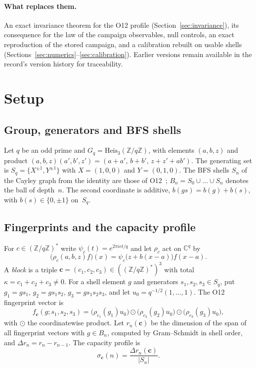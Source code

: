 \documentclass[12pt,a4paper]{article}
\theoremstyle{definition}
\theoremstyle{remark}
\newcommand{\Heis}{\mathrm{Heis}_3}
\newcommand{\Zq}{\mathbb{Z}/q\mathbb{Z}}
\newcommand{\Zqs}{(\mathbb{Z}/q\mathbb{Z})^{*}}
\begin{document}
  \paragraph{What replaces them.}
  An exact invariance theorem for the O12 profile (Section~\ref{sec:invariance}), its
  consequence for the law of the campaign observables, null controls, an exact reproduction of
  the stored campaign, and a calibration rebuilt on usable shells
  (Sections~\ref{sec:numerics}--\ref{sec:calibration}).
  Earlier versions remain available in the record's version history for traceability.

  \section{Setup}
  \label{sec:setup}

  \subsection{Group, generators and BFS shells}

    Let $q$ be an odd prime and $G_q=\Heis(\Zq)$, with elements $(a,b,z)$ and product
    $(a,b,z)(a',b',z')=(a+a',\,b+b',\,z+z'+ab')$.
    The generating set is $S_q=\{X^{\pm1},Y^{\pm1}\}$ with $X=(1,0,0)$ and $Y=(0,1,0)$.
    The BFS shells $S_n$ of the Cayley graph from the identity are those of
    O12~\cite{Beau2026a16}; $B_n=S_0\cup\dots\cup S_n$ denotes the ball of depth~$n$.
    The second coordinate is additive, $b(gs)=b(g)+b(s)$, with $b(s)\in\{0,\pm1\}$ on~$S_q$.

  \subsection{Fingerprints and the capacity profile}

    For $c\in\Zqs$ write $\psi_c(t)=e^{2\pi i ct/q}$ and let $\rho_c$ act on $\mathbb{C}^q$ by
    \begin{equation}
      \bigl(\rho_c(a,b,z)f\bigr)(x)=\psi_c\bigl(z+b(x-a)\bigr)f(x-a).
      \label{eq:schrodinger}
    \end{equation}
    A \emph{block} is a triple $\mathbf c=(c_1,c_2,c_3)\in(\Zqs)^3$ with total
    $\kappa=c_1+c_2+c_3\neq0$.
    For a shell element $g$ and generators $s_1,s_2,s_3\in S_q$, put $g_1=gs_1$,
    $g_2=gs_1s_2$, $g_3=gs_1s_2s_3$, and let $u_0=q^{-1/2}(1,\dots,1)$.
    The O12 fingerprint vector is
    \begin{equation}
      f_{\mathbf c}(g;s_1,s_2,s_3)
      =\bigl(\rho_{c_1}(g_1)u_0\bigr)\odot\bigl(\rho_{c_2}(g_2)u_0\bigr)\odot
      \bigl(\rho_{c_3}(g_3)u_0\bigr),
      \label{eq:fingerprint}
    \end{equation}
    with $\odot$ the coordinatewise product.
    Let $r_n(\mathbf c)$ be the dimension of the span of all fingerprint vectors with $g\in B_n$,
    computed by Gram--Schmidt in shell order, and $\Delta r_n=r_n-r_{n-1}$.
    The capacity profile is
    \begin{equation}
      \sigma_{\mathbf c}(n)=\frac{\Delta r_n(\mathbf c)}{|S_n|}.
      \label{eq:sigma}
    \end{equation}
\end{document}
